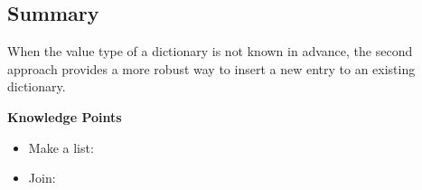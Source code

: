 \subsection{Summary}
When the value type of a dictionary is not known in advance, the second approach provides a more robust way to insert a new entry to an existing dictionary.

\begin{noteblock}
\textbf{Knowledge Points}
\begin{itemize}
\item Make a list: \href{https://code.kx.com/q/ref/enlist/}{}
\item Join: \href{https://code.kx.com/q/ref/join/}{\q{,}}
\end{itemize}
\end{noteblock}

\clearpage
